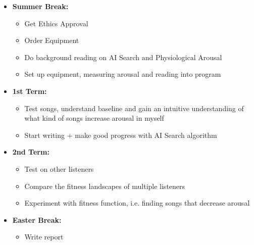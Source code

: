 \documentclass[a4paper,12pt]{article}
\begin{document}
	\begin{itemize}
		\item \textbf{Summer Break:}
		\begin{itemize}
			\item Get Ethics Approval
			\item Order Equipment
			\item Do background reading on AI Search and Physiological Arousal
			\item Set up equipment, measuring arousal and reading into program
		\end{itemize}
		\item \textbf{1st Term:}
		\begin{itemize}
			\item Test songs, understand baseline and gain an intuitive understanding of what kind of songs increase arousal in myself
			\item Start writing + make good progress with AI Search algorithm
		\end{itemize}
		\item \textbf{2nd Term:}
		\begin{itemize}
			\item Test on other listeners
			\item Compare the fitness landscapes of multiple listeners
			\item Experiment with fitness function, i.e. finding songs that decrease arousal
		\end{itemize}
		\item \textbf{Easter Break:}
		\begin{itemize}
			\item Write report
		\end{itemize}
	\end{itemize}
	
	
\end{document}

